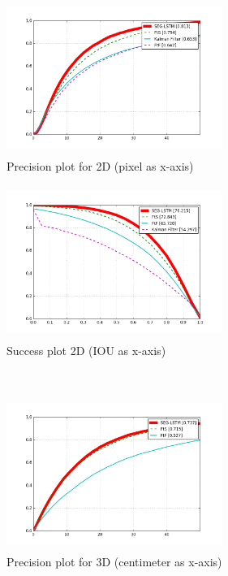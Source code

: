 \documentclass[10pt,twocolumn,letterpaper]{article}
\begin{document}
\begin{figure}[t]
   \centering
    \begin{subfigure}[c]{0.4\textwidth}
    \centering
    \includegraphics[width=7cm,height=5cm, clip]{figures/precision_plot_2d.png}
    \caption{\small{Precision plot for 2D (pixel as x-axis)}}
    \end{subfigure}%
    \begin{subfigure}[c]{0.4\textwidth}
    \centering
        \includegraphics[width=7cm,height=5cm, clip]{figures/success_plot_2d.png}
        \caption{\small{Success plot 2D (IOU as x-axis)}}
    \end{subfigure}
    \\
     \begin{subfigure}[c]{0.4\textwidth}
     \includegraphics[width=7cm,height=5cm, clip]{figures/precision_plot_3d_20cm.png}
    \caption{\small{Precision plot for 3D (centimeter as x-axis)}}
    \end{subfigure}%
    \begin{subfigure}[c]{0.4\textwidth}

\end{subfigure}
\end{figure}
\end{document}
